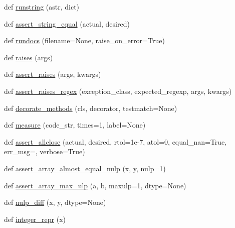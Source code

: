 \begin{DoxyCompactItemize}
\item 
def \hyperlink{namespacenumpy_1_1testing_1_1__private_1_1utils_a0b3b4184cfb5ec5d8ce7e63d0dc1a540}{runstring} (astr, dict)
\item 
def \hyperlink{namespacenumpy_1_1testing_1_1__private_1_1utils_a85e2c3231e3b30e38a9111f8edbfa5a7}{assert\+\_\+string\+\_\+equal} (actual, desired)
\item 
def \hyperlink{namespacenumpy_1_1testing_1_1__private_1_1utils_a48c115c99f509ef5e51a2b610b9a6e23}{rundocs} (filename=None, raise\+\_\+on\+\_\+error=True)
\item 
def \hyperlink{namespacenumpy_1_1testing_1_1__private_1_1utils_af50ad97ef3fcf1029e5250c655c06687}{raises} (args)
\item 
def \hyperlink{namespacenumpy_1_1testing_1_1__private_1_1utils_a0cb4ae77f7e52eaa850106e64cadeae0}{assert\+\_\+raises} (args, kwargs)
\item 
def \hyperlink{namespacenumpy_1_1testing_1_1__private_1_1utils_acd8515eb99f8c5de4fa3d8739189eb1e}{assert\+\_\+raises\+\_\+regex} (exception\+\_\+class, expected\+\_\+regexp, args, kwargs)
\item 
def \hyperlink{namespacenumpy_1_1testing_1_1__private_1_1utils_ab3485b0cc46433a51e48bb37e97ea91e}{decorate\+\_\+methods} (cls, decorator, testmatch=None)
\item 
def \hyperlink{namespacenumpy_1_1testing_1_1__private_1_1utils_aeb40a64ac09b4589ba74fa1de7c188b9}{measure} (code\+\_\+str, times=1, label=None)
\item 
def \hyperlink{namespacenumpy_1_1testing_1_1__private_1_1utils_af089bfc5ce33a59f9f9b1335b339f20b}{assert\+\_\+allclose} (actual, desired, rtol=1e-\/7, atol=0, equal\+\_\+nan=\+True, err\+\_\+msg=\textquotesingle{}\textquotesingle{}, verbose=\+True)
\item 
def \hyperlink{namespacenumpy_1_1testing_1_1__private_1_1utils_a48ac54684bf7392a75e119bb59ec2904}{assert\+\_\+array\+\_\+almost\+\_\+equal\+\_\+nulp} (x, y, nulp=1)
\item 
def \hyperlink{namespacenumpy_1_1testing_1_1__private_1_1utils_ab3937c62090eaf83fd16920e81bc51a2}{assert\+\_\+array\+\_\+max\+\_\+ulp} (a, b, maxulp=1, dtype=None)
\item 
def \hyperlink{namespacenumpy_1_1testing_1_1__private_1_1utils_af91821dc1359818c781c899387e54815}{nulp\+\_\+diff} (x, y, dtype=None)
\item 
def \hyperlink{namespacenumpy_1_1testing_1_1__private_1_1utils_afadd7a26ace0ebf2ba465d5f565ce283}{integer\+\_\+repr} (x)
\item 

\end{DoxyCompactItemize}
